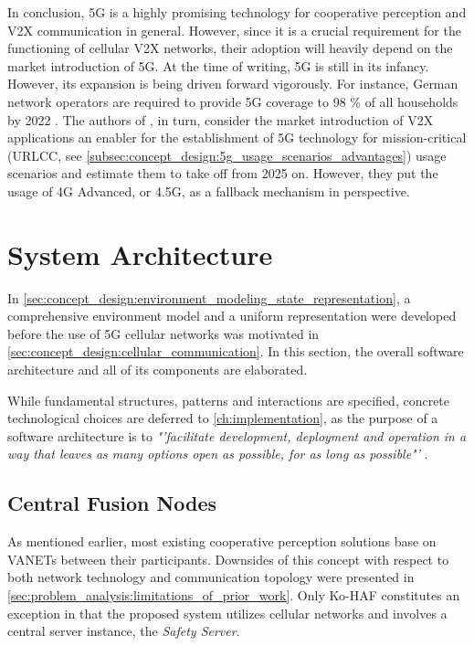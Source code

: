 In conclusion, 5G is a highly promising technology for cooperative perception and V2X communication in general. However, since it is a crucial requirement for the functioning of cellular V2X networks, their adoption will heavily depend on the market introduction of 5G. At the time of writing, 5G is still in its infancy. However, its expansion is being driven forward vigorously. For instance, German network operators are required to provide 5G coverage to 98 \% of all households by 2022 \cite{DeutscheWelle2019}. The authors of \cite{CCSInsight2018}, in turn, consider the market introduction of V2X applications an enabler for the establishment of 5G technology for mission-critical (URLCC, see \cref{subsec:concept_design:5g_usage_scenarios_advantages}) usage scenarios and estimate them to take off from 2025 on. However, they put the usage of 4G Advanced, or 4.5G, as a fallback mechanism in perspective.

\section{System Architecture}
\label{sec:concept_design:system_architecture}
In \cref{sec:concept_design:environment_modeling_state_representation}, a comprehensive environment model and a uniform representation were developed before the use of 5G cellular networks was motivated in \cref{sec:concept_design:cellular_communication}. In this section, the overall software architecture and all of its components are elaborated.

While fundamental structures, patterns and interactions are specified, concrete technological choices are deferred to \cref{ch:implementation}, as the purpose of a software architecture is to \textit{"'facilitate development, deployment and operation in a way that leaves as many options open as possible, for as long as possible"'} \cite{Martin2017}.

\subsection{Central Fusion Nodes}
\label{subsec:concept_design:central_fusion_nodes}
As mentioned earlier, most existing cooperative perception solutions base on VANETs between their participants. Downsides of this concept with respect to both network technology and communication topology were presented in \cref{sec:problem_analysis:limitations_of_prior_work}. Only Ko-HAF \cite{Hohm2019} constitutes an exception in that the proposed system utilizes cellular networks and involves a central server instance, the \textit{Safety Server}.

